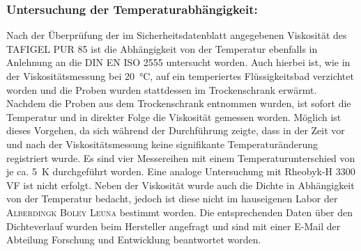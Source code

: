 \subsubsection{Untersuchung der Temperaturabhängigkeit:} 
Nach der Überprüfung der im Sicherheitsdatenblatt angegebenen Viskosität des TAFIGEL PUR 85 ist die Abhängigkeit von der Temperatur ebenfalls in Anlehnung an die DIN EN ISO 2555 untersucht worden. Auch hierbei ist, wie in der Viskositätsmessung bei \SI{20}{\celsius}, auf ein temperiertes Flüssigkeitsbad verzichtet worden und die Proben wurden stattdessen im Trockenschrank erwärmt. Nachdem die Proben aus dem Trockenschrank entnommen wurden, ist sofort die Temperatur und in direkter Folge die Viskosität gemessen worden. Möglich ist dieses Vorgehen, da sich während der Durchführung zeigte, dass in der Zeit vor und nach der Viskositätsmessung keine signifikante Temperaturänderung registriert wurde. Es sind vier Messereihen mit einem Temperaturunterschied von je ca. \SI{5}{\kelvin} durchgeführt worden. Eine analoge Untersuchung mit Rheobyk-H 3300 VF ist nicht erfolgt.\linebreak
Neben der Viskosität wurde auch die Dichte in Abhängigkeit von der Temperatur bedacht, jedoch ist diese nicht im hauseigenen Labor der \textsc{Alberdingk Boley Leuna} bestimmt worden. Die entsprechenden Daten über den Dichteverlauf wurden beim Hersteller angefragt und sind mit einer E-Mail der Abteilung Forschung und Entwicklung beantwortet worden.

